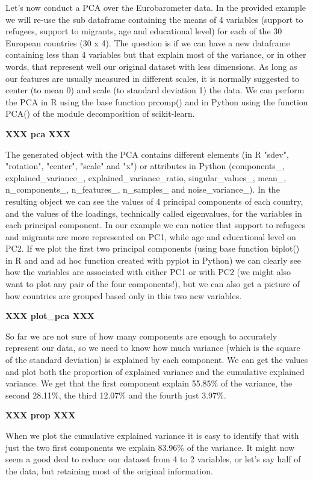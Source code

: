 Let's now conduct a PCA over the Eurobarometer data.  In the provided example we will re-use the sub dataframe containing the means of 4 variables (support to refugees, support to migrants, age and educational level) for each of the 30 European countries (30 x 4). The question is if we can have a new dataframe containing less than 4 variables but that explain most of the variance, or in other words, that represent well our original dataset with less dimensions. As long as our features are usually measured in different scales, it is normally suggested to center (to mean 0) and scale (to standard deviation 1) the data. We can perform the PCA in R using the base function prcomp() and in Python using the function PCA() of the module decomposition of scikit-learn. 

\textbf{XXX  pca  XXX}

The generated object with the PCA contains different elements (in R "sdev",     "rotation", "center",  "scale" and   "x") or attributes in Python (components\_, explained\_variance\_, explained\_variance\_ratio, singular\_values\_, mean\_, n\_components\_, n\_features\_, n\_samples\_ and noise\_variance\_). In the resulting object we can see the values of 4 principal components of each country, and the values of the loadings, technically called eigenvalues, for the variables in each principal component. In our example we can notice that support to refugees and migrants are more represented on PC1, while age and educational level on PC2. If we plot the first two principal components (using base function biplot() in R and and ad hoc function created with pyplot in Python) we can clearly see how the variables are associated with either PC1 or with PC2 (we might also want to plot any pair of the four components!), but we can also get a picture of how countries are grouped based only in this two new variables.

\textbf{XXX  plot\_pca  XXX}

So far we are not sure of how many components are enough to accurately represent our data, so we need to know how much variance (which is the square of the standard deviation) is explained by each component. We can get the values and plot both the proportion of explained variance and the cumulative explained variance. We get that the first component explain 55.85\% of the variance, the second 28.11\%, the third 12.07\% and the fourth just 3.97\%. 

\textbf{XXX  prop  XXX}

When we plot the cumulative explained variance it is easy to identify that with just the two first components we explain 83.96\% of the variance. It might now seem a good deal to reduce our dataset from 4 to 2 variables, or let’s say half of the data, but retaining most of the original information.


